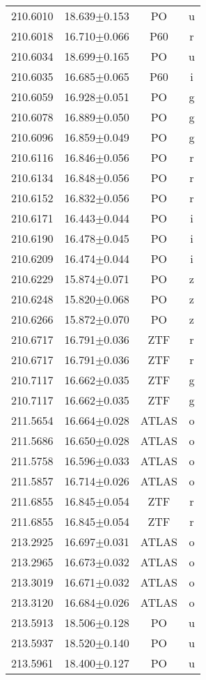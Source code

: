 \begin{table}
\begin{tabular}{cccc}
210.6010 & 18.639$\pm$0.153 & PO & u \\
210.6018 & 16.710$\pm$0.066 & P60 & r \\
210.6034 & 18.699$\pm$0.165 & PO & u \\
210.6035 & 16.685$\pm$0.065 & P60 & i \\
210.6059 & 16.928$\pm$0.051 & PO & g \\
210.6078 & 16.889$\pm$0.050 & PO & g \\
210.6096 & 16.859$\pm$0.049 & PO & g \\
210.6116 & 16.846$\pm$0.056 & PO & r \\
210.6134 & 16.848$\pm$0.056 & PO & r \\
210.6152 & 16.832$\pm$0.056 & PO & r \\
210.6171 & 16.443$\pm$0.044 & PO & i \\
210.6190 & 16.478$\pm$0.045 & PO & i \\
210.6209 & 16.474$\pm$0.044 & PO & i \\
210.6229 & 15.874$\pm$0.071 & PO & z \\
210.6248 & 15.820$\pm$0.068 & PO & z \\
210.6266 & 15.872$\pm$0.070 & PO & z \\
210.6717 & 16.791$\pm$0.036 & ZTF & r \\
210.6717 & 16.791$\pm$0.036 & ZTF & r \\
210.7117 & 16.662$\pm$0.035 & ZTF & g \\
210.7117 & 16.662$\pm$0.035 & ZTF & g \\
211.5654 & 16.664$\pm$0.028 & ATLAS & o \\
211.5686 & 16.650$\pm$0.028 & ATLAS & o \\
211.5758 & 16.596$\pm$0.033 & ATLAS & o \\
211.5857 & 16.714$\pm$0.026 & ATLAS & o \\
211.6855 & 16.845$\pm$0.054 & ZTF & r \\
211.6855 & 16.845$\pm$0.054 & ZTF & r \\
213.2925 & 16.697$\pm$0.031 & ATLAS & o \\
213.2965 & 16.673$\pm$0.032 & ATLAS & o \\
213.3019 & 16.671$\pm$0.032 & ATLAS & o \\
213.3120 & 16.684$\pm$0.026 & ATLAS & o \\
213.5913 & 18.506$\pm$0.128 & PO & u \\
213.5937 & 18.520$\pm$0.140 & PO & u \\
213.5961 & 18.400$\pm$0.127 & PO & u \\

\end{tabular}
\end{table}
